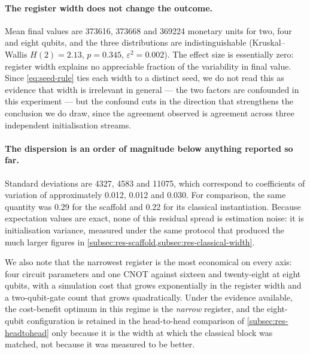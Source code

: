 \documentclass[aps,floatfix,superscriptaddress,twocolumn,tightenlines,amsmath,amssymb,nofootinbib,10pt,longbibliography,prl]{revtex4-2}
\begin{document}
\paragraph{The register width does not change the outcome.} Mean final values
are \num{373616}, \num{373668} and \num{369224} monetary units for two, four and
eight qubits, and the three distributions are indistinguishable
(Kruskal--Wallis $H(2) = 2.13$, $p = 0.345$, $\varepsilon^2 = 0.002$). The
effect size is essentially zero: register width explains no appreciable fraction
of the variability in final value. Since \ref{eq:seed-rule} ties each width to a
distinct seed, we do not read this as evidence that width is irrelevant in
general --- the two factors are confounded in this experiment --- but the
confound cuts in the direction that strengthens the conclusion we do draw, since
the agreement observed is agreement across three independent initialisation
streams.

\paragraph{The dispersion is an order of magnitude below anything reported so
far.} Standard deviations are \num{4327}, \num{4583} and \num{11075}, which
correspond to coefficients of variation of approximately \num{0.012},
\num{0.012} and \num{0.030}. For comparison, the same quantity was \num{0.29}
for the scaffold and \num{0.22} for its classical instantiation. Because
expectation values are exact, none of this residual spread is estimation noise:
it is initialisation variance, measured under the same protocol that produced
the much larger figures in \ref{subsec:res-scaffold,subsec:res-classical-width}.

We also note that the narrowest register is the most economical on every axis:
four circuit parameters and one CNOT against sixteen and twenty-eight at eight
qubits, with a simulation cost that grows exponentially in the register width
and a two-qubit-gate count that grows quadratically. Under the evidence
available, the cost-benefit optimum in this regime is the \emph{narrow}
register, and the eight-qubit configuration is retained in the head-to-head
comparison of \ref{subsec:res-headtohead} only because it is the width at which
the classical block was matched, not because it was measured to be better.
\end{document}
